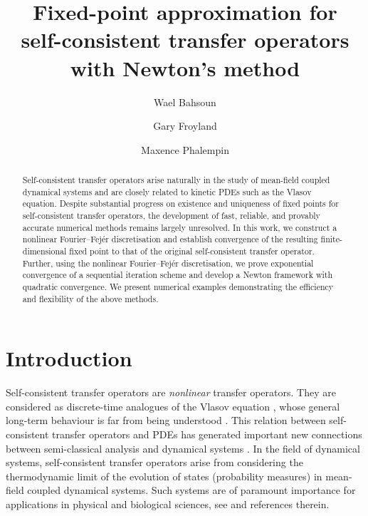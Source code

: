 \documentclass[12pt]{article}
\title{Fixed-point approximation for\\ self-consistent transfer operators with Newton's method}
\author[1]{Wael Bahsoun}
\author[2]{Gary Froyland}
\author[2]{Maxence Phalempin}
\affil[1]{Department of Mathematical Sciences\authorcr Loughborough University, Leicestershire LE11 3TU, UK}
\affil[2]{School of Mathematics and Statistics\authorcr UNSW Sydney, Sydney NSW 2052, Australia}
\date{}
\theoremstyle{plain}
\begin{document}
\maketitle
\begin{abstract}
  Self-consistent transfer operators arise naturally in the study of mean-field coupled dynamical systems and are closely related to kinetic PDEs such as the Vlasov equation. Despite substantial progress on existence and uniqueness of fixed points for self-consistent transfer operators, the development of fast, reliable, and provably accurate numerical methods remains largely unresolved. In this work, we construct a nonlinear Fourier–Fejér discretisation and establish convergence of the resulting finite-dimensional fixed point to that of the original self-consistent transfer operator. Further, using the nonlinear Fourier–Fejér discretisation, we prove exponential convergence of a sequential iteration scheme and develop a Newton framework with quadratic convergence. We present numerical examples demonstrating the efficiency and flexibility of the above methods.
\end{abstract}%
\section{Introduction}
Self-consistent transfer operators are \emph{nonlinear} transfer operators. They are considered as discrete-time analogues of the Vlasov equation \cite{Vla68}, whose general long-term behaviour is far from being understood \cite{CelVil11}. This relation between self-consistent transfer operators and PDEs has generated important new connections between semi-classical analysis \cite{chabuetetal24} and dynamical systems \cite{BL25,bahetal23}. In the field of dynamical systems, self-consistent transfer operators arise from considering the thermodynamic limit of the evolution of states (probability measures) in mean-field coupled dynamical systems. Such systems are of paramount importance for applications in physical  and biological sciences, see \cite{DBB23, SP24, tanzi23} and references therein.
 
\end{document}
